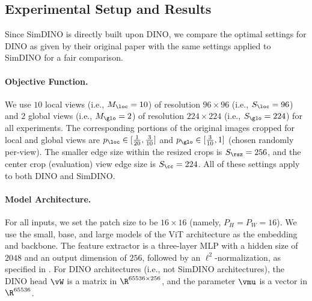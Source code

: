 \documentclass[../../book-main.tex]{subfiles}
\begin{document}
\subsection{Experimental Setup and Results}
\label{sub:contrastive_learning_experiment_results}

Since SimDINO is directly built upon DINO, we compare the optimal
settings for DINO as given by their original paper
\citep{caron2021emerging} with the same settings applied to SimDINO
\cite{wu2025simplifying}
for a fair comparison.

\paragraph{Objective Function.} We use \(10\) local views (i.e.,
\(M_{\loc} = 10\)) of resolution \(96 \times 96\) (i.e., \(S_{\loc} =
96\)) and \(2\) global views (i.e., \(M_{\glo} = 2\)) of resolution
\(224 \times 224\) (i.e., \(S_{\glo} = 224\)) for all experiments.
The corresponding portions of the original images cropped for local
and global views are \(p_{\loc} \in [\frac{1}{20}, \frac{3}{10}]\)
and \(p_{\glo} \in [\frac{3}{10}, 1]\) (chosen randomly per-view).
The smaller edge size within the resized crops is \(S_{\rsz} = 256\),
and the center crop (evaluation) view edge size is \(S_{\cc} = 224\).
All of these settings apply to both DINO and SimDINO.

\paragraph{Model Architecture.} For all inputs, we set the patch size
to be \(16 \times 16\) (namely, \(P_{H} = P_{W} = 16\)). We use the
small, base, and large models of the ViT \citep{dosovitskiy2020image}
architecture as the embedding and backbone. The feature extractor is
a three-layer MLP with a hidden size of \(2048\) and an output
dimension of \(256\), followed by an \(\ell^{2}\)-normalization, as
specified in . For DINO
architectures (i.e., not SimDINO architectures), the DINO head
\(\vW\) is a matrix in \(\R^{65536 \times 256}\), and the parameter
\(\vmu\) is a vector in \(\R^{65536}\).
\end{document}
